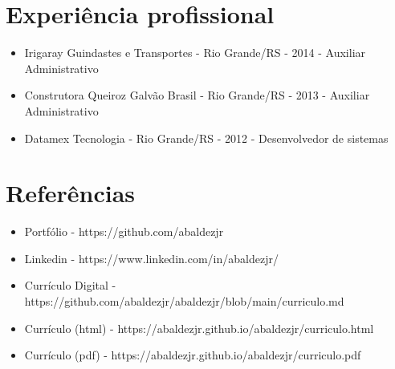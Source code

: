 \documentclass[11pt,oneside,a4paper]{article}
\begin{document}
    \section*{Experiência profissional}
    \begin{itemize}
        \item Irigaray Guindastes e Transportes - Rio Grande/RS - 2014 - Auxiliar Administrativo
        \item Construtora Queiroz Galvão Brasil - Rio Grande/RS - 2013 - Auxiliar Administrativo
        \item Datamex Tecnologia - Rio Grande/RS - 2012 - Desenvolvedor de sistemas
    \end{itemize}
    \section*{Referências}
    \begin{itemize}
        \item Portfólio - https://github.com/abaldezjr
        \item Linkedin - https://www.linkedin.com/in/abaldezjr/
        \item Currículo Digital - https://github.com/abaldezjr/abaldezjr/blob/main/curriculo.md
        \item Currículo (html) - https://abaldezjr.github.io/abaldezjr/curriculo.html
        \item Currículo (pdf) - https://abaldezjr.github.io/abaldezjr/curriculo.pdf
    \end{itemize}
\end{document}

